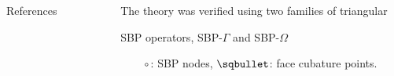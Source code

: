 \documentclass[final]{beamer}
\newlength{\sepwid}
\newlength{\secondcolwid}
\newlength{\thirdcolwid}
\begin{document}
\begin{frame}[t]
\begin{columns}[t]
\begin{column}{\secondcolwid}
\begin{block}{References}
    \nocite{*} %
    \footnotesize{
        \vspace{0.15in}}
    
\end{block}
\end{column} %


\begin{column}{\sepwid}\end{column} %







\begin{column}{\thirdcolwid}
     \setlength{\parindent}{1em}
\vskip-1.0cm
\begin{alertblock}{The theory was verified using two families of triangular
        
         SBP operators, SBP-$\Gamma$ and SBP-$\Omega$~\cite{multiSBP}}
$\quad\quad\circ$: SBP nodes, $\sqbullet$: face cubature points.


\end{alertblock}
\end{column}
\end{columns}
\end{frame}
\end{document}
